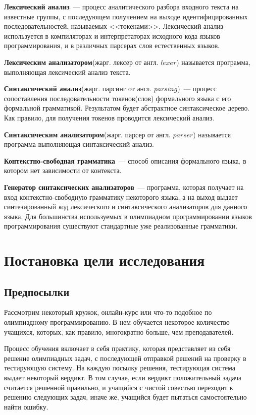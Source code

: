 \textbf{Лексический анализ}~--- процесс аналитического разбора 
входного текста на известные группы, с последующем получением на выходе 
идентифицированных последовательностей, называемых <<токенами>>. 
Лексический анализ используется в компиляторах и интерпретаторах исходного кода языков программирования, 
и в различных парсерах слов естественных языков.

\textbf{Лексическим анализатором}(жарг. лексер от англ. $lexer$) называется программа, выполняющая лексический анализ текста.

\textbf{Синтаксический анализ}(жарг. парсинг от англ. $parsing$)~--- процесс сопоставления последовательности токенов(слов)
формального языка с его формальной грамматикой. Результатом будет абстрактное синтаксическое дерево. Как правило, для получения
токенов проводится лексический анализ.

\textbf{Синтаксическим анализатором}(жарг. парсер от англ. $parser$) называется программа выполняющая синтаксический анализ.

\textbf{Контекстно-свободная грамматика}~---  способ описания формального языка, в котором нет зависимости от контекста.

\textbf{Генератор синтаксических анализаторов}~--- программа, которая получает на вход контекстно-свободную грамматику 
некоторого языка, а на выход выдает синтезированный код лексического и синтаксического анализаторов для данного языка.
Для большинства используемых в олимпиадном программировании языков программирования 
существуют стандартные уже реализованные грамматики.

\section{Постановка цели исследования}
\subsection{Предпосылки}

Рассмотрим некоторый кружок, онлайн-курс или что-то подобное по олимпиадному программированию. 
В нем обучается некоторое количество учащихся, которых, как правило, многократно больше, чем преподавателей.

Процесс обучения включает в себя практику, которая представляет из себя решение олимпиадных задач, с последующей
отправкой решений на проверку в тестирующую систему. На каждую посылку решения, тестирующая система выдает некоторый вердикт.
В том случае, если вердикт положительный задача считается решенной правильно, и учащийся с чистой совестью переходит к решению
следующих задач, иначе же, учащийся будет пытаться самостоятельно найти ошибку.

